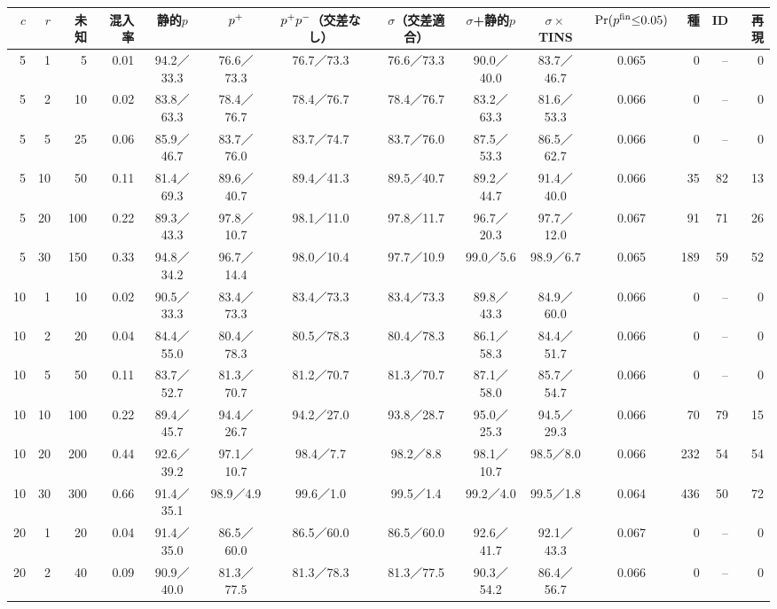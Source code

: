 {\fontsize{6.0pt}{7.1pt}\selectfont\renewcommand{\arraystretch}{1.0}%
\setlength{\tabcolsep}{1.4pt}\begin{tabular}{@{}rrrr|cccccc|c|rrr@{}}
\hline
\rule[-2.0pt]{0pt}{8.2pt}$c$ & $r$ & 未知 & 混入率 & 静的$p$ & $p^{+}$ & $p^{+}p^{-}$（交差なし） & $\sigma$（交差適合） & $\sigma$+静的$p$ & $\sigma\times$TINS & $\Pr(p^{\mathrm{fin}}{\le}0.05)$ & 種 & ID & 再現 \\
\hline
5 & 1 & 5 & 0.01 & 94.2／33.3 & 76.6／73.3 & 76.7／73.3 & 76.6／73.3 & 90.0／40.0 & 83.7／46.7 & 0.065 & 0 & -- & 0 \\
5 & 2 & 10 & 0.02 & 83.8／63.3 & 78.4／76.7 & 78.4／76.7 & 78.4／76.7 & 83.2／63.3 & 81.6／53.3 & 0.066 & 0 & -- & 0 \\
5 & 5 & 25 & 0.06 & 85.9／46.7 & 83.7／76.0 & 83.7／74.7 & 83.7／76.0 & 87.5／53.3 & 86.5／62.7 & 0.066 & 0 & -- & 0 \\
5 & 10 & 50 & 0.11 & 81.4／69.3 & 89.6／40.7 & 89.4／41.3 & 89.5／40.7 & 89.2／44.7 & 91.4／40.0 & 0.066 & 35 & 82 & 13 \\
5 & 20 & 100 & 0.22 & 89.3／43.3 & 97.8／10.7 & 98.1／11.0 & 97.8／11.7 & 96.7／20.3 & 97.7／12.0 & 0.067 & 91 & 71 & 26 \\
5 & 30 & 150 & 0.33 & 94.8／34.2 & 96.7／14.4 & 98.0／10.4 & 97.7／10.9 & 99.0／5.6 & 98.9／6.7 & 0.065 & 189 & 59 & 52 \\
10 & 1 & 10 & 0.02 & 90.5／33.3 & 83.4／73.3 & 83.4／73.3 & 83.4／73.3 & 89.8／43.3 & 84.9／60.0 & 0.066 & 0 & -- & 0 \\
10 & 2 & 20 & 0.04 & 84.4／55.0 & 80.4／78.3 & 80.5／78.3 & 80.4／78.3 & 86.1／58.3 & 84.4／51.7 & 0.066 & 0 & -- & 0 \\
10 & 5 & 50 & 0.11 & 83.7／52.7 & 81.3／70.7 & 81.2／70.7 & 81.3／70.7 & 87.1／58.0 & 85.7／54.7 & 0.066 & 0 & -- & 0 \\
10 & 10 & 100 & 0.22 & 89.4／45.7 & 94.4／26.7 & 94.2／27.0 & 93.8／28.7 & 95.0／25.3 & 94.5／29.3 & 0.066 & 70 & 79 & 15 \\
10 & 20 & 200 & 0.44 & 92.6／39.2 & 97.1／10.7 & 98.4／7.7 & 98.2／8.8 & 98.1／10.7 & 98.5／8.0 & 0.066 & 232 & 54 & 54 \\
10 & 30 & 300 & 0.66 & 91.4／35.1 & 98.9／4.9 & 99.6／1.0 & 99.5／1.4 & 99.2／4.0 & 99.5／1.8 & 0.064 & 436 & 50 & 72 \\
20 & 1 & 20 & 0.04 & 91.4／35.0 & 86.5／60.0 & 86.5／60.0 & 86.5／60.0 & 92.6／41.7 & 92.1／43.3 & 0.067 & 0 & -- & 0 \\
20 & 2 & 40 & 0.09 & 90.9／40.0 & 81.3／77.5 & 81.3／78.3 & 81.3／77.5 & 90.3／54.2 & 86.4／56.7 & 0.066 & 0 & -- & 0 \\

\end{tabular}}
